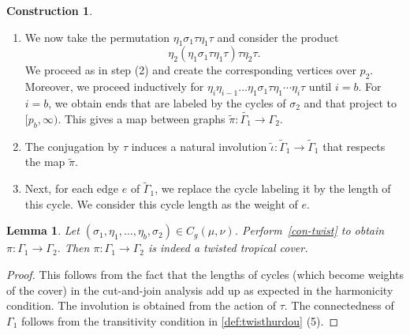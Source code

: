 \documentclass[11pt]{article}
\newtheorem{lemma}[theo]{Lemma}
\theoremstyle{definition}
\numberwithin{equation}{section}
\newtheorem{construction}[theo]{Construction}
\begin{document}
\begin{construction}
\begin{enumerate}
\begin{enumerate}
\begin{figure}[H]
{}
        \end{figure}

    \end{enumerate}
    In each case, we further extend all ends not attached to a vertex over $p_1$ to~$[p_1,p_2]$.
    \item We now take the permutation $\eta_1\sigma_1\tau\eta_1\tau$ and consider the product
    \begin{equation*}
        \eta_2(\eta_1\sigma_1\tau\eta_1\tau)\tau\eta_2\tau.
    \end{equation*}
    We proceed as in step (2) and create the corresponding vertices over $p_2$. Moreover, we proceed inductively for $\eta_i\eta_{i-1}\dots\eta_1\sigma_1\tau\eta_1\cdots\eta_i\tau$ until $i=b$. For $i=b$, we obtain ends that are labeled by the cycles of $\sigma_2$ and that project to $[p_b,\infty)$. This gives a map between graphs $\tilde{\pi}\colon\tilde{\Gamma_1}\to\Gamma_2$.
    \item The conjugation by $\tau$ induces a natural involution $
    \tilde{\iota}\colon\tilde{\Gamma}_1\to\tilde{\Gamma}_1$ that respects the map $\tilde{\pi}$.
    \item Next, for each edge $e$ of $\tilde{\Gamma}_1$, we replace the cycle labeling it by the length of this cycle. We consider this cycle length as the weight of $e$. 
\end{enumerate}
\end{construction}

\begin{lemma}\label{lem-outcomeconstruction}
Let $(\sigma_1,
\eta_1,\dots,\eta_b,\sigma_2)\in C_g(\mu,\nu)$. Perform~\cref{con-twist} to obtain $\pi\colon\Gamma_1\to\Gamma_2$. Then $\pi\colon\Gamma_1\to\Gamma_2$ is indeed a twisted tropical cover.
    \end{lemma}

\begin{proof}
    This follows from the fact that the lengths of cycles (which become weights of the cover) in the cut-and-join analysis add up as expected in the harmonicity condition. The involution is obtained from the action of $\tau$. The connectedness of $\Gamma_1$ follows from the transitivity condition in \cref{def:twisthurdou} (5).
\end{proof}
\end{document}
